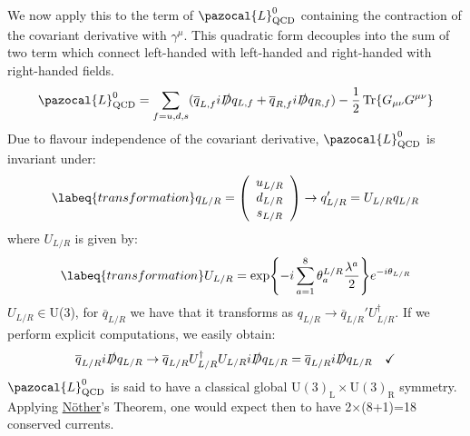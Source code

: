 \documentclass[../main.tex]{subfiles}
\begin{document}
We now apply this to the term of $\pazocal{L}_{\text{QCD}}^0$ containing the contraction of the covariant derivative with $\gamma^\mu$. This quadratic form decouples into the sum of two term which connect left-handed with left-handed and right-handed with right-handed fields.
\[
\pazocal{L}_{\text{QCD}}^0=\sum_{f=u,d,s}(\overline{q}_{L,f}i\slashed{D}q_{L,f}+\overline{q}_{R,f}i\slashed{D}q_{R,f})-\frac{1}{2}\Tr{G_{\mu\nu}G^{\mu\nu}}
\]
Due to flavour independence of the covariant derivative, $\pazocal{L}_{\text{QCD}}^0$ is invariant under:
\[
\labeq{transformation}
q_{L/R}=\left(\begin{array}{c}
    u_{L/R}\\
    d_{L/R}\\
    s_{L/R}
\end{array}\right)\to q_{L/R}'=U_{L/R}q_{L/R}
\]
where $U_{L/R}$ is given by:
\begin{equation}
\labeq{transformation}
U_{L/R}=\exp{-i\sum_{a=1}^8\theta_a^{L/R}\frac{\lambda^a}{2}}e^{-i\theta_{L/R}}
\end{equation}
$U_{L/R}\in$U(3), for $\overline{q}_{L/R}$ we have that it transforms as $q_{L/R}\to\overline{q}_{L/R}'U_{L/R}^\dagger$. If we perform explicit computations, we easily obtain:
\[
\overline{q}_{L/R}i\slashed{D}q_{L/R}\to\overline{q}_{L/R}U_{L/R}^\dagger U_{L/R}i\slashed{D}q_{L/R}=\overline{q}_{L/R}i\slashed{D}q_{L/R} \quad \checkmark
\]
$\pazocal{L}_{\text{QCD}}^0$ is said to have a classical global U$(3)_{\text{L}}\times$U$(3)_{\text{R}}$ symmetry. Applying \href{https://en.wikipedia.org/wiki/Emmy_Noether}{N\"other}'s Theorem, one would expect then to have 2$\times$(8+1)=18 conserved currents.
\end{document}
